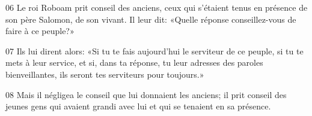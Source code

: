 
06 Le roi Roboam prit conseil des anciens, ceux qui s’étaient tenus en présence de son père Salomon, de son vivant. Il leur dit: «Quelle réponse conseillez-vous de faire à ce peuple?»

07 Ils lui dirent alors: «Si tu te fais aujourd’hui le serviteur de ce peuple, si tu te mets à leur service, et si, dans ta réponse, tu leur adresses des paroles bienveillantes, ils seront tes serviteurs pour toujours.»

08 Mais il négligea le conseil que lui donnaient les anciens; il prit conseil des jeunes gens qui avaient grandi avec lui et qui se tenaient en sa présence.
